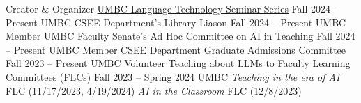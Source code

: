 {\color{black}\fontsize{12pt}{1em}} 

\begin{cventries}
\cventry
    {Creator \& Organizer}
    {\href{https://laramartin.net/LaTeSS.html}{UMBC Language Technology Seminar Series}}
    {Fall 2024 -- Present}
    {UMBC}
    {}
\cventry
    {}
    {CSEE Department's Library Liason}
    {Fall 2024 -- Present}
    {UMBC}
    {}  
\cventry
    {Member}
    {UMBC Faculty Senate's Ad Hoc Committee on AI in Teaching}
    {Fall 2024 -- Present}
    {UMBC}
    {}  
\cventry
    {Member}
    {CSEE Department Graduate Admissions Committee}
    {Fall 2023 -- Present}
    {UMBC}
    {}    
\cventry
    {Volunteer}
    {Teaching about LLMs to Faculty Learning Committees (FLCs)}
    {Fall 2023 -- Spring 2024}
    {UMBC}
    {\textit{Teaching in the era of AI} FLC (11/17/2023, 4/19/2024)\newline
    \textit{AI in the Classroom} FLC (12/8/2023)}   
\end{cventries}


